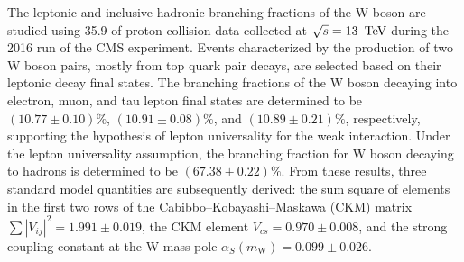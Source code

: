 \abstract

The leptonic and inclusive hadronic branching fractions of the W boson are studied using 35.9 \fbinv of proton collision data collected at $\sqrt{s}=13~\,\text{Te\hspace{-.08em}V}$ during the 2016 run of the CMS experiment. Events characterized by the production of two W boson pairs, mostly from top quark pair decays, are selected based on their leptonic decay final states. The branching fractions of the W boson decaying into electron, muon, and tau lepton final states are determined to be $(10.77 \pm 0.10)\%$, $(10.91 \pm 0.08)\%$, and $(10.89 \pm 0.21)\%$, respectively, supporting the hypothesis of lepton universality for the weak interaction. Under the lepton universality assumption, the branching fraction for W boson decaying to hadrons is determined to be $(67.38 \pm 0.22)\%$. From these results, three standard model quantities are subsequently derived: the sum square of elements in the first two rows of the Cabibbo--Kobayashi--Maskawa (CKM) matrix  $\sum{\left|V_{ij}\right|^{2}} = 1.991 \pm 0.019$, the CKM element $V_{cs} = 0.970 \pm 0.008$, and the strong coupling constant at the W mass pole $\alpha_{S}(m_\mathrm{W}) = 0.099 \pm 0.026$.